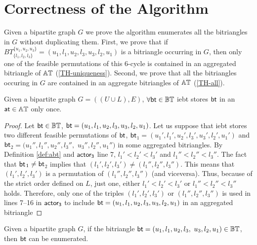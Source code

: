 \clearpage
\section{Correctness of the Algorithm}
Given a bipartite graph $G$ we prove the algorithm enumerates all the bitriangles in $G$  without duplicating them. 
First, we prove that if $BT_{\{l_1,l_2,l_3\}}^{\{u_1,u_2,u_3\}} = (u_1,l_1,u_2,l_3,u_3,l_2,u_1)$ is a bitriangle occurring in $G$, then only one of the feasible permutations of this 6-cycle is contained in an aggregated bitriangle of $\mathbb{AT}$  (\autoref{TH-uniqueness}). Second, we prove that  all the bitriangles occuring in $G$ are contained in an aggregate bitriangles of $\mathbb{AT}$ (\autoref{TH-all}). 
%
\begin{theorem}[Uniqueness] \label{TH-uniqueness} 
Given a bipartite graph $G = ((U\cup L),E)$, $\forall \mathsf{bt}\in\mathbb{BT}$  \acrshort{iebt} stores $\mathsf{bt}$ in an $\mathsf{at}\in \mathbb{AT}$ only once.

\end{theorem}
\begin{proof}
Let $\mathsf{bt}\in \mathbb{BT}$, $\mathsf{bt} = (u_1,l_1,u_2,l_3,u_3,l_2,u_1)$. Let us suppose that \acrshort{iebt} stores two different feasible permutations of $\mathsf{bt}$, $\mathsf{bt}$$_1= (u_1',l_1',u_2',l_3',u_3',l_2',u_1')$ and $\mathsf{bt}$$_2 = (u_1'',l_1'',u_2'',l_3'',$ $u_3'',l_2'',u_1'')$ in some aggregated bitriangles. By Definition \ref{def:abt} and $\mathsf{actor_3}$ line 7, $l_1'<l_2'<l_3'$ and $l_1''<l_2''<l_3''$. The fact that $\mathsf{bt}$$_1 \neq \mathsf{bt}$$_2$ implies that $(l_1',l_2',l_3') \neq (l_1'',l_2'',l_3'')$. This means that  $(l_1',l_2',l_3')$ is a permutation of $(l_1'',l_2'',l_3'')$ (and viceversa). Thus, because of the strict order defined on $L$,  just one, either   $l_1'<l_2'<l_3'$ or $l_1''<l_2''<l_3''$ holds. Therefore, only one of the triples $(l_1',l_2',l_3')$ or $(l_1'',l_2'',l_3'')$  is used in lines 7--16 in $\mathsf{actor_3}$ to include $\mathsf{bt} = (u_1,l_1,u_2,l_3,u_3,l_2,u_1)$ in an aggregated bitriangle
\end{proof}
 
\begin{theorem}\label{TH-all}Given a bipartite graph $G$, if the bitriangle $\mathsf{bt} = (u_1,l_1,u_2,l_3,$ $u_3,l_2,u_1)\in \mathbb{BT}$, then $\mathsf{bt}$  can be enumerated.
\end{theorem}

